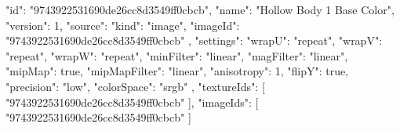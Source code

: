 {
  "id": "9743922531690de26cc8d3549ff0cbcb",
  "name": "Hollow Body 1 Base Color",
  "version": 1,
  "source": {
    "kind": "image",
    "imageId": "9743922531690de26cc8d3549ff0cbcb"
  },
  "settings": {
    "wrapU": "repeat",
    "wrapV": "repeat",
    "wrapW": "repeat",
    "minFilter": "linear",
    "magFilter": "linear",
    "mipMap": true,
    "mipMapFilter": "linear",
    "anisotropy": 1,
    "flipY": true,
    "precision": "low",
    "colorSpace": "srgb"
  },
  "textureIds": [
    "9743922531690de26cc8d3549ff0cbcb"
  ],
  "imageIds": [
    "9743922531690de26cc8d3549ff0cbcb"
  ]
}
